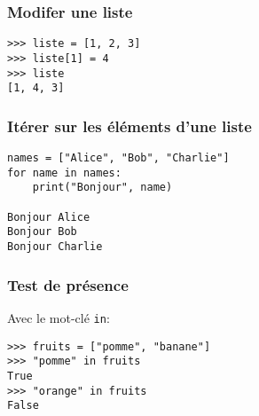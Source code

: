 \documentclass{beamer}
\begin{document}
\begin{frame}[fragile]
  \frametitle{Modifer une liste}
\begin{lstlisting}
>>> liste = [1, 2, 3]
>>> liste[1] = 4
>>> liste
[1, 4, 3]
\end{lstlisting}

\end{frame}

\begin{frame}[fragile]
  \frametitle{Itérer sur les éléments d'une liste}
\begin{lstlisting}
names = ["Alice", "Bob", "Charlie"]
for name in names:
    print("Bonjour", name)

Bonjour Alice
Bonjour Bob
Bonjour Charlie
\end{lstlisting}

\end{frame}

\begin{frame}[fragile]
  \frametitle{Test de présence}

Avec le mot-clé \texttt{in}:

\vfill

\begin{lstlisting}
>>> fruits = ["pomme", "banane"]
>>> "pomme" in fruits
True
>>> "orange" in fruits
False
\end{lstlisting}

\end{frame}
\end{document}
